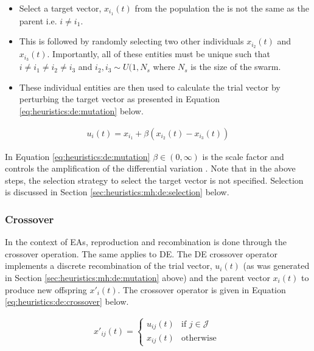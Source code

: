 \begin{itemize}
      \item Select a target vector, $x_{i_{1}}(t)$ from the population the is not the same as the parent i.e. $i \neq i_{1}$.
      \item This is followed by randomly selecting two other individuals $x_{i_{2}}(t)$ and $x_{i_{3}}(t)$. Importantly, all of these entities must be unique such that $i \neq i_{1} \neq i_{2} \neq i_{3}$ and $i_{2}, i_{3} \sim U(1, N_{s}$ where $N_{s}$ is the size of the swarm.
      \item These individual entities are then used to calculate the trial vector by perturbing the target vector as presented in Equation \ref{eq:heuristics:de:mutation} below.
\end{itemize}


\begin{equation}
      \label{eq:heuristics:de:mutation}
      \begin{split}
            u_{i}(t) = x_{i_{1}} + \beta(x_{i_{2}}(t) - x_{i_{3}}(t))
      \end{split}
\end{equation}

In Equation \ref{eq:heuristics:de:mutation} $\beta \in (0, \infty)$ is the scale factor and controls the amplification of the differential variation \cite{ref:engelbrecht:2007}. Note that in the above steps, the selection strategy to select the target vector is not specified. Selection is discussed in Section \ref{sec:heuristics:mh:de:selection} below.


\subsubsection{Crossover}
\label{sec:heuristics:mh:de:crossover}

In the context of \acp{EA}, reproduction and recombination is done through the crossover operation. The same applies to \ac{DE}. The \ac{DE} crossover operator implements a discrete recombination of the trial vector, $u_{i}(t)$ (as was generated in Section \ref{sec:heuristics:mh:de:mutation} above) and the parent vector $x_{i}(t)$ to produce new offspring $x'_{i}(t)$. The crossover operator is given in Equation \ref{eq:heuristics:de:crossover} below.

\begin{equation}
      \label{eq:heuristics:de:crossover}
      \begin{split}
            x'_{ij}(t)=
            \begin{cases}
                  u_{ij}(t) & \text{if } j \in \mathcal{J} \\
                  x_{ij}(t) & \text{otherwise }
            \end{cases}
      \end{split}
\end{equation}

